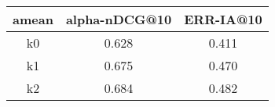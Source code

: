 \begin{tabular}{c|c|c} \hline
amean & alpha-nDCG@10 & ERR-IA@10 \\ \hline\hline
k0 & 0.628 & 0.411 \\ \hline
k1 & 0.675 & 0.470 \\ \hline
k2 & 0.684 & 0.482 \\ \hline
\end{tabular}
